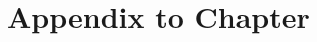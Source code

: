 \documentclass[main.tex]{subfiles}
\begin{document}
\ifSubfilesClassLoaded{
}{}

\chapter{Appendix to Chapter}
\Blindtext

\ifSubfilesClassLoaded{

}{}
\end{document}

